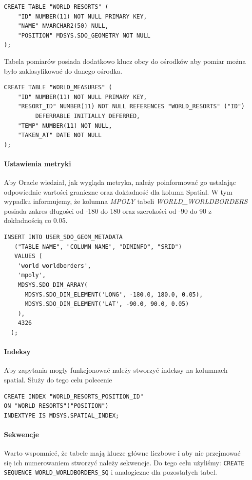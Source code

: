 \documentclass[12pt]{article}
\begin{document}
\begin{verbatim}
CREATE TABLE "WORLD_RESORTS" (
    "ID" NUMBER(11) NOT NULL PRIMARY KEY,
    "NAME" NVARCHAR2(50) NULL,
    "POSITION" MDSYS.SDO_GEOMETRY NOT NULL
);
\end{verbatim}

Tabela pomiarów posiada dodatkowo klucz obcy do ośrodków aby pomiar można było zaklasyfikować do
danego ośrodka.
\begin{verbatim}
CREATE TABLE "WORLD_MEASURES" (
    "ID" NUMBER(11) NOT NULL PRIMARY KEY,
    "RESORT_ID" NUMBER(11) NOT NULL REFERENCES "WORLD_RESORTS" ("ID")
         DEFERRABLE INITIALLY DEFERRED,
    "TEMP" NUMBER(11) NOT NULL,
    "TAKEN_AT" DATE NOT NULL
);
\end{verbatim}

\paragraph{Ustawienia metryki}
Aby Oracle wiedział, jak wygląda metryka, należy poinformować go ustalając odpowiednie wartości graniczne
oraz dokładność dla kolumn Spatial. W tym wypadku informujemy, że kolumna \emph{MPOLY} tabeli
\emph{WORLD\_WORLDBORDERS} posiada zakres długości od -180 do 180 oraz szerokości od -90 do 90 z dokładnością
co 0.05.

\begin{verbatim}
INSERT INTO USER_SDO_GEOM_METADATA
   ("TABLE_NAME", "COLUMN_NAME", "DIMINFO", "SRID")
   VALUES (
    'world_worldborders',
    'mpoly',
    MDSYS.SDO_DIM_ARRAY(
      MDSYS.SDO_DIM_ELEMENT('LONG', -180.0, 180.0, 0.05),
      MDSYS.SDO_DIM_ELEMENT('LAT', -90.0, 90.0, 0.05)
    ),
    4326
  );
\end{verbatim}

\paragraph{Indeksy}
Aby zapytania mogły funkcjonować należy stworzyć indeksy na kolumnach spatial. Służy do tego celu polecenie
\begin{verbatim}
CREATE INDEX "WORLD_RESORTS_POSITION_ID"
ON "WORLD_RESORTS"("POSITION")
INDEXTYPE IS MDSYS.SPATIAL_INDEX;
\end{verbatim}

\paragraph{Sekwencje}
Warto wspomnieć, że tabele mają klucze główne liczbowe i aby nie przejmować się ich numerowaniem
stworzyć należy sekwencje. Do tego celu użyliśmy:
\texttt{CREATE SEQUENCE WORLD\_WORLDBORDERS\_SQ}
i analogiczne dla pozostałych tabel.
\end{document}
